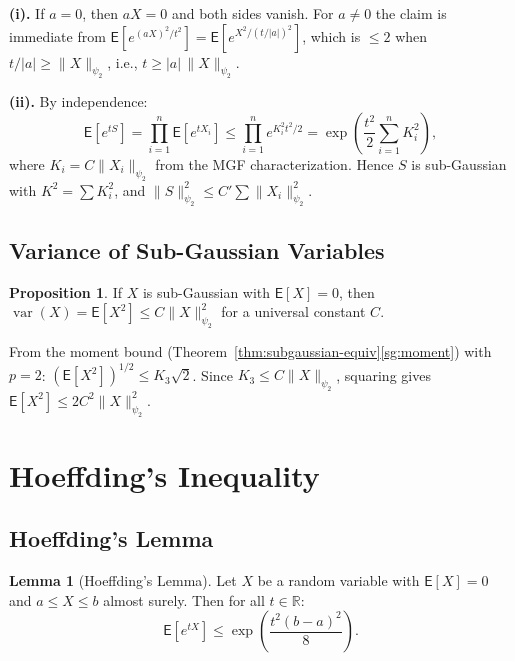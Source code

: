 \documentclass[12pt,a4paper]{article}
\makeatletter
\theoremstyle{definition}
\newtheorem{lemma}[theorem]{Lemma}
\newtheorem{proposition}[theorem]{Proposition}
\renewenvironment{proof}[1][\proofname]{\par
  \pushQED{\qed}%
  \normalfont \topsep6\p@\@plus6\p@\relax
  \trivlist
  \item[\hskip\labelsep\bfseries #1\@addpunct{.}]\ignorespaces
}{%
  \popQED\endtrivlist\@endpefalse
}
\newcommand\expc{\mathsf{E}}
\DeclareMathOperator\var{var}
\newcommand{\Real}{\mathbb{R}}
\makeatother
\begin{document}
\begin{proof}
\textbf{(i).} If $a = 0$, then $aX = 0$ and both sides vanish. For $a \neq 0$ the claim is immediate from $\expc[e^{(aX)^2/t^2}] = \expc[e^{X^2/(t/|a|)^2}]$, which is $\leqslant 2$ when $t/|a| \geqslant \|X\|_{\psi_2}$, i.e., $t \geqslant |a|\,\|X\|_{\psi_2}$.

\textbf{(ii).} By independence:
\[
\expc\!\left[e^{tS}\right] = \prod_{i=1}^n \expc\!\left[e^{tX_i}\right] \leqslant \prod_{i=1}^n e^{K_i^2 t^2/2} = \exp\!\left(\frac{t^2}{2}\sum_{i=1}^n K_i^2\right),
\]
where $K_i = C\|X_i\|_{\psi_2}$ from the MGF characterization. Hence $S$ is sub-Gaussian with $K^2 = \sum K_i^2$, and $\|S\|_{\psi_2}^2 \leqslant C'\sum\|X_i\|_{\psi_2}^2$.
\end{proof}

\subsection{Variance of Sub-Gaussian Variables}

\begin{proposition}\label{prop:sg-variance}
If $X$ is sub-Gaussian with $\expc[X] = 0$, then $\var(X) = \expc[X^2] \leqslant C\|X\|_{\psi_2}^2$ for a universal constant $C$.
\end{proposition}

\begin{proof}
From the moment bound (Theorem~\ref{thm:subgaussian-equiv}\ref{sg:moment}) with $p = 2$: $(\expc[X^2])^{1/2} \leqslant K_3\sqrt{2}$. Since $K_3 \leqslant C\|X\|_{\psi_2}$, squaring gives $\expc[X^2] \leqslant 2C^2\|X\|_{\psi_2}^2$.
\end{proof}

\section{Hoeffding's Inequality}\label{sec:hoeffding}

\subsection{Hoeffding's Lemma}

\begin{lemma}[Hoeffding's Lemma]\label{lem:hoeffding-lemma}
Let $X$ be a random variable with $\expc[X] = 0$ and $a \leqslant X \leqslant b$ almost surely. Then for all $t \in \Real$:
\begin{equation}\label{eq:hoeffding-lemma}
\expc[e^{tX}] \leqslant \exp\!\left(\frac{t^2(b-a)^2}{8}\right).
\end{equation}
\end{lemma}
\end{document}
